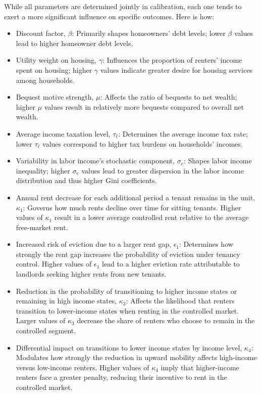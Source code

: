\documentclass[parskip=full]{article}
\begin{document}
While all parameters are determined jointly in calibration, each one tends to exert a more significant influence on specific outcomes. Here is how:
\begin{itemize}
    \item Discount factor, $\beta$: Primarily shapes homeowners' debt levels; lower $\beta$ values lead to higher homeowner debt levels.
    \item Utility weight on housing, $\gamma$: Influences the proportion of renters' income spent on housing; higher $\gamma$ values indicate greater desire for housing services among households.
    \item Bequest motive strength, $\mu$: Affects the ratio of bequests to net wealth; higher $\mu$ values result in relatively more bequests compared to overall net wealth.
    \item Average income taxation level, $\tau_{\ell}$: Determines the average income tax rate; lower $\tau_{\ell}$ values correspond to higher tax burdens on households' incomes.
    \item Variability in labor income's stochastic component, $\sigma_{e}$: Shapes labor income inequality; higher $\sigma_{e}$ values lead to greater dispersion in the labor income distribution and thus higher Gini coefficients.
    \item Annual rent decrease for each additional period a tenant remains in the unit, $\kappa_1$: Governs how much rents decline over time for sitting tenants. Higher values of $\kappa_1$ result in a lower average controlled rent relative to the average free-market rent.    
    \item Increased risk of eviction due to a larger rent gap, $\epsilon_1$: Determines how strongly the rent gap increases the probability of eviction under tenancy control. Higher values of $\epsilon_1$ lead to a higher eviction rate attributable to landlords seeking higher rents from new tenants.
    \item Reduction in the probability of transitioning to higher income states or remaining in high income states, $\kappa_3$: Affects the likelihood that renters transition to lower-income states when renting in the controlled market. Larger values of $\kappa_3$ decrease the share of renters who choose to remain in the controlled segment.
    \item Differential impact on transitions to lower income states by income level, $\kappa_4$: Modulates how strongly the reduction in upward mobility affects high-income versus low-income renters. Higher values of $\kappa_4$ imply that higher-income renters face a greater penalty, reducing their incentive to rent in the controlled market.

\end{itemize}
\end{document}
